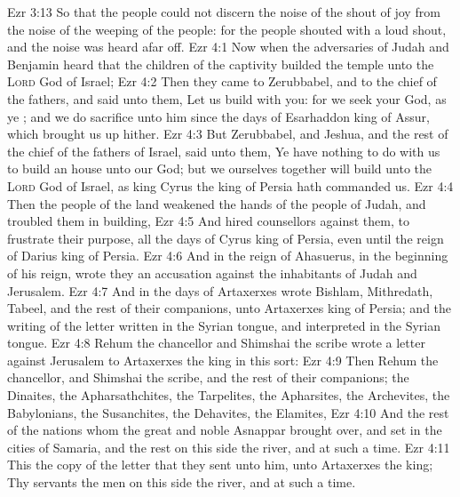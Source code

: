 \vs Ezr 3:13 So that the people could not discern the noise of the shout of joy from the noise of the weeping of the people: for the people shouted with a loud shout, and the noise was heard afar off.
\vs Ezr 4:1 Now when the adversaries of Judah and Benjamin heard that the children of the captivity builded the temple unto the \textsc{Lord} God of Israel;
\vs Ezr 4:2 Then they came to Zerubbabel, and to the chief of the fathers, and said unto them, Let us build with you: for we seek your God, as ye ; and we do sacrifice unto him since the days of Esarhaddon king of Assur, which brought us up hither.
\vs Ezr 4:3 But Zerubbabel, and Jeshua, and the rest of the chief of the fathers of Israel, said unto them, Ye have nothing to do with us to build an house unto our God; but we ourselves together will build unto the \textsc{Lord} God of Israel, as king Cyrus the king of Persia hath commanded us.
\vs Ezr 4:4 Then the people of the land weakened the hands of the people of Judah, and troubled them in building,
\vs Ezr 4:5 And hired counsellors against them, to frustrate their purpose, all the days of Cyrus king of Persia, even until the reign of Darius king of Persia.
\vs Ezr 4:6 And in the reign of Ahasuerus, in the beginning of his reign, wrote they  an accusation against the inhabitants of Judah and Jerusalem.
\vs Ezr 4:7 And in the days of Artaxerxes wrote Bishlam, Mithredath, Tabeel, and the rest of their companions, unto Artaxerxes king of Persia; and the writing of the letter  written in the Syrian tongue, and interpreted in the Syrian tongue.
\vs Ezr 4:8 Rehum the chancellor and Shimshai the scribe wrote a letter against Jerusalem to Artaxerxes the king in this sort:
\vs Ezr 4:9 Then  Rehum the chancellor, and Shimshai the scribe, and the rest of their companions; the Dinaites, the Apharsathchites, the Tarpelites, the Apharsites, the Archevites, the Babylonians, the Susanchites, the Dehavites,  the Elamites,
\vs Ezr 4:10 And the rest of the nations whom the great and noble Asnappar brought over, and set in the cities of Samaria, and the rest  on this side the river, and at such a time.
\vs Ezr 4:11 This  the copy of the letter that they sent unto him,  unto Artaxerxes the king; Thy servants the men on this side the river, and at such a time.
